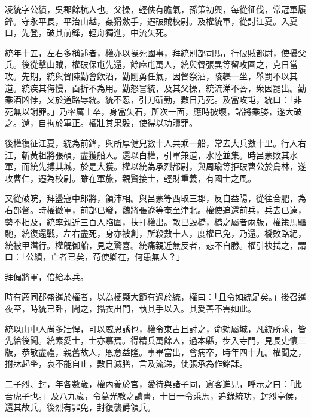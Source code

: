 \begin{pinyinscope}
 
 
 凌統字公績，吳郡餘杭人也。父操，輕俠有膽氣，孫策初興，每從征伐，常冠軍履鋒。守永平長，平治山越，姦猾斂手，遷破賊校尉。及權統軍，從討江夏。入夏口，先登，破其前鋒，輕舟獨進，中流矢死。
 
 
 
 
 統年十五，左右多稱述者，權亦以操死國事，拜統別部司馬，行破賊都尉，使攝父兵。後從擊山賊，權破保屯先還，餘麻屯萬人，統與督張異等留攻圍之，克日當攻。先期，統與督陳勤會飲酒，勤剛勇任氣，因督祭酒，陵轢一坐，舉罰不以其道。統疾其侮慢，靣折不為用。勤怒詈統，及其父操，統流涕不荅，衆因罷出。勤乘酒凶悖，又於道路辱統。統不忍，引刀斫勤，數日乃死。及當攻屯，統曰：「非死無以謝罪。」乃率厲士卒，身當矢石，所次一靣，應時披壞，諸將乘勝，遂大破之。還，自拘於軍正。權壯其果毅，使得以功贖罪。
 
 
 
 
 後權復征江夏，統為前鋒，與所厚健兒數十人共乘一船，常去大兵數十里。行入右江，斬黃祖將張碩，盡獲船人。還以白權，引軍兼道，水陸並集。時呂蒙敗其水軍，而統先搏其城，於是大獲。權以統為承烈都尉，與周瑜等拒破曹公於烏林，遂攻曹仁，遷為校尉。雖在軍旅，親賢接士，輕財重義，有國士之風。
 
 
 
 
 又從破皖，拜盪寇中郎將，領沛相。與呂蒙等西取三郡，反自益陽，從往合肥，為右部督。時權徹軍，前部已發，魏將張遼等奄至津北。權使追還前兵，兵去已遠，勢不相及，統率親近三百人陷圍，扶扞權出。敵已毀橋，橋之屬者兩版，權策馬驅馳，統復還戰，左右盡死，身亦被創，所殺數十人，度權已免，乃還。橋敗路絕，統被甲潛行。權旣御船，見之驚喜。統痛親近無反者，悲不自勝。權引袂拭之，謂曰：「公績，亡者已矣，苟使卿在，何患無人？」
 
 
 拜偏將軍，倍給本兵。
 
 
 
 
 時有薦同郡盛暹於權者，以為梗槩大節有過於統，權曰：「且令如統足矣。」後召暹夜至，時統已卧，聞之，攝衣出門，執其手以入。其愛善不害如此。
 
 
 
 
 統以山中人尚多壯悍，可以威恩誘也，權令東占且討之，命勑屬城，凡統所求，皆先給後聞。統素愛士，士亦慕焉。得精兵萬餘人，過本縣，步入寺門，見長吏懷三版，恭敬盡禮，親舊故人，恩意益隆。事畢當出，會病卒，時年四十九。權聞之，拊牀起坐，哀不能自止，數日減膳，言及流涕，使張承為作銘誄。
 
 
二子烈、封，年各數歲，權內養於宮，愛待與諸子同，賔客進見，呼示之曰：「此吾虎子也。」及八九歲，令葛光教之讀書，十日一令乘馬，追錄統功，封烈亭侯，還其故兵。後烈有罪免，封復襲爵領兵。
 
 
\end{pinyinscope}